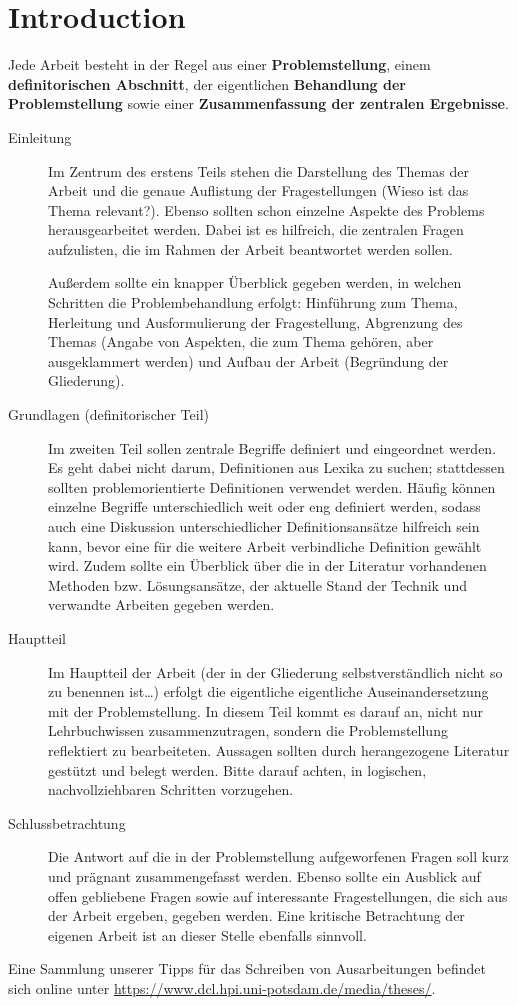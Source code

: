 \chapter{Introduction}

Jede Arbeit besteht in der Regel aus einer \textbf{Problemstellung}, einem \textbf{definitorischen Abschnitt}, der eigentlichen \textbf{Behandlung der Problemstellung} sowie einer \textbf{Zusammenfassung der zentralen Ergebnisse}.

\begin{description}

	\item[Einleitung] Im Zentrum des erstens Teils stehen die Darstellung des Themas der Arbeit und die genaue Auflistung der Fragestellungen (Wieso ist das Thema relevant?). Ebenso sollten schon einzelne Aspekte des Problems herausgearbeitet werden. Dabei ist es hilfreich, die zentralen Fragen aufzulisten, die im Rahmen der Arbeit beantwortet werden sollen.
	
	Außerdem sollte ein knapper Überblick gegeben werden, in welchen Schritten die Problembehandlung erfolgt: Hinführung zum Thema, Herleitung und Ausformulierung der Fragestellung, Abgrenzung des Themas (Angabe von Aspekten, die zum Thema gehören, aber ausgeklammert werden) und Aufbau der Arbeit (Begründung der Gliederung).
	
	\item[Grundlagen (definitorischer Teil)] Im zweiten Teil sollen zentrale Begriffe definiert und eingeordnet werden. Es geht dabei nicht darum, Definitionen aus Lexika zu suchen; stattdessen sollten problemorientierte Definitionen verwendet werden. Häufig können einzelne Begriffe unterschiedlich weit oder eng definiert werden, sodass auch eine Diskussion unterschiedlicher Definitionsansätze hilfreich sein kann, bevor eine für die weitere Arbeit verbindliche Definition gewählt wird. Zudem sollte ein Überblick über die in der Literatur vorhandenen Methoden bzw. Lösungsansätze, der aktuelle Stand der Technik und verwandte Arbeiten gegeben werden.
	
	\item[Hauptteil] Im Hauptteil der Arbeit (der in der Gliederung selbstverständlich nicht so zu benennen ist\ldots) erfolgt die eigentliche eigentliche Auseinandersetzung mit der Problemstellung. In diesem Teil kommt es darauf an, nicht nur Lehrbuchwissen zusammenzutragen, sondern die Problemstellung reflektiert zu bearbeiteten. Aussagen sollten durch herangezogene Literatur gestützt und belegt werden. Bitte darauf achten, in logischen, nachvollziehbaren Schritten vorzugehen.
	
	\item[Schlussbetrachtung] Die Antwort auf die in der Problemstellung aufgeworfenen Fragen soll kurz und prägnant zusammengefasst werden. Ebenso sollte ein Ausblick auf offen gebliebene Fragen sowie auf interessante Fragestellungen, die sich aus der Arbeit ergeben, gegeben werden. Eine kritische Betrachtung der eigenen Arbeit ist an dieser Stelle ebenfalls sinnvoll.

\end{description}

\noindent
Eine Sammlung unserer Tipps für das Schreiben von Ausarbeitungen befindet sich online unter \url{https://www.dcl.hpi.uni-potsdam.de/media/theses/}.